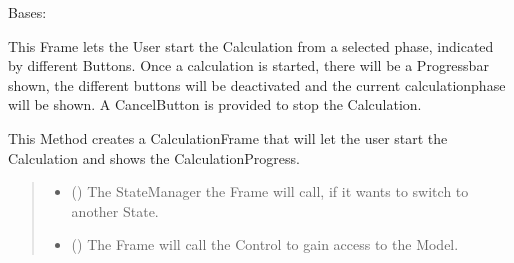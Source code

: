 \documentclass[letterpaper,10pt,english]{sphinxmanual}
\begin{document}
\begin{fulllineitems}
\label{\detokenize{apidoc/src.osm_configurator.view.toplevelframes:src.osm_configurator.view.toplevelframes.calculation_frame.CalculationFrame}}
\pysigstartsignatures
{}
\pysigstopsignatures
\sphinxAtStartPar
Bases: {\hyperref[\detokenize{apidoc/src.osm_configurator.view.toplevelframes:src.osm_configurator.view.toplevelframes.top_level_frame.TopLevelFrame}]{}}

\sphinxAtStartPar
This Frame lets the User start the Calculation from a selected phase, indicated by different Buttons.
Once a calculation is started, there will be a Progressbar shown, the different buttons will be deactivated
and the current calculation\sphinxhyphen{}phase will be shown.
A Cancel\sphinxhyphen{}Button is provided to stop the Calculation.

\begin{fulllineitems}
\label{\detokenize{apidoc/src.osm_configurator.view.toplevelframes:src.osm_configurator.view.toplevelframes.calculation_frame.CalculationFrame.__init__}}
\pysigstartsignatures
{}
\pysigstopsignatures
\sphinxAtStartPar
This Method creates a CalculationFrame that will let the user start the Calculation
and shows the Calculation\sphinxhyphen{}Progress.
\begin{quote}\begin{description}
\begin{itemize}
\item {} 
\sphinxAtStartPar
{} ({\hyperref[\detokenize{apidoc/src.osm_configurator.view.states:src.osm_configurator.view.states.state_manager.StateManager}]{}}) \textendash{} The StateManager the Frame will call, if it wants to switch to another State.

\item {} 
\sphinxAtStartPar
{} ({\hyperref[\detokenize{apidoc/src.osm_configurator.control:src.osm_configurator.control.control_interface.IControl}]{}}) \textendash{} The Frame will call the Control to gain access to the Model.

\end{itemize}

\end{description}\end{quote}

\end{fulllineitems}


\end{fulllineitems}
\end{document}
